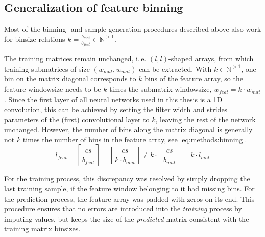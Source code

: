 \subsection{Generalization of feature binning} \label{sec:methods:inputBinning}
Most of the binning- and sample generation procedures described above 
also work for binsize relations $k=\frac{b_\mathit{mat}}{b_\mathit{feat}} \in \mathbb{N}^{>1}$.

The training matrices remain unchanged, i.\,e. $(l, l)$-shaped arrays, from which training submatrices of size  $(w_\mathit{mat}, w_\mathit{mat})$
can be extracted. 
With $k \in \mathbb{N}^{>1}$, one bin on the matrix diagonal corresponds to $k$ bins of the feature array,
so the feature windowsize needs to be $k$ times the submatrix windowsize, $w_\mathit{feat} = k \cdot w_\mathit{mat}$.
Since the first layer of all neural networks used in this thesis is a 1D convolution,
this can be achieved by setting the filter width and strides parameters of the (first) convolutional layer to $k$, leaving the rest of the network unchanged.
However, the number of bins along the matrix diagonal is generally not $k$ times the number of bins in the feature array,
see \cref{eq:methods:binning}.
\begin{equation}
 l_\mathit{feat} = \left \lceil{\frac{cs}{b_\mathit{feat}}}\right \rceil
                = \left \lceil{\frac{cs}{k \cdot b_\mathit{mat}}}\right \rceil 
                \not = k \cdot \left \lceil{\frac{cs}{ b_\mathit{mat}}}\right \rceil
                = k \cdot l_\mathit{mat} \label{eq:methods:binning}
\end{equation}

For the training process, this discrepancy was resolved by simply dropping the last training sample, 
if the feature window belonging to it had missing bins.
For the prediction process, the feature array was padded with zeros on its end.
This procedure ensures that no errors are introduced into the \emph{training} process by imputing values,
but keeps the size of the \emph{predicted} matrix consistent with the training matrix binsizes.

